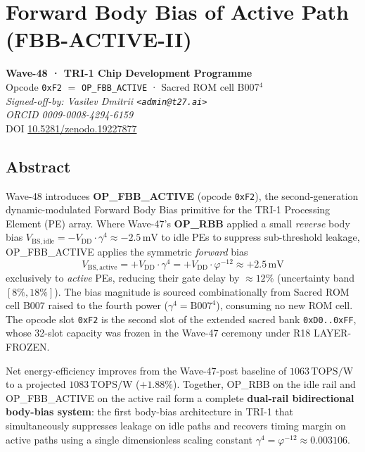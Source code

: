 \documentclass[12pt,a4paper]{report}
\theoremstyle{plain}
\theoremstyle{definition}
\theoremstyle{remark}
\newcommand{\opcode}[1]{\texttt{#1}}
\newcommand{\vbs}{V_{\mathrm{BS,active}}}
\newcommand{\vdd}{V_{\mathrm{DD}}}
\newcommand{\gammaFour}{\gamma^{4}}
\newcommand{\phiInvTwelve}{\varphi^{-12}}
\newcommand{\topsw}{\mathrm{TOPS/W}}
\newcommand{\iopFBB}{\opcode{OP\_FBB\_ACTIVE}}
\begin{document}
\setcounter{chapter}{107}   %

\chapter{Forward Body Bias of Active Path (FBB-ACTIVE-II)}
\label{chap:fbb_active}

\begin{center}
  \small
  \textbf{Wave-48 · TRI-1 Chip Development Programme} \\[2pt]
  Opcode \opcode{0xF2} $=$ \iopFBB{} · Sacred ROM cell B007$^{4}$ \\[2pt]
  \textit{Signed-off-by: Vasilev Dmitrii \texttt{<admin@t27.ai>}} \\
  \textit{ORCID 0009-0008-4294-6159} \\[2pt]
  DOI \href{https://doi.org/10.5281/zenodo.19227877}{10.5281/zenodo.19227877}
\end{center}

\section*{Abstract}
\label{sec:abstract}

Wave-48 introduces \textbf{OP\_FBB\_ACTIVE} (opcode \opcode{0xF2}), the second-generation
dynamic-modulated Forward Body Bias primitive for the TRI-1 Processing Element (PE) array.
Where Wave-47's \textbf{OP\_RBB} applied a small \emph{reverse} body bias
$V_{\mathrm{BS,idle}} = -\vdd \cdot \gammaFour \approx -2.5\,\mathrm{mV}$ to idle PEs to
suppress sub-threshold leakage, OP\_FBB\_ACTIVE applies the symmetric \emph{forward} bias
\begin{equation}
  \vbs = +\vdd \cdot \gammaFour = +\vdd \cdot \phiInvTwelve \approx +2.5\,\mathrm{mV}
\end{equation}
exclusively to \emph{active} PEs, reducing their gate delay by $\approx 12\%$ (uncertainty band
$[8\%,18\%]$).  The bias magnitude is sourced combinationally from Sacred ROM cell B007 raised to
the fourth power ($\gammaFour = \mathrm{B007}^{4}$), consuming no new ROM cell.  The opcode slot
\opcode{0xF2} is the second slot of the extended sacred bank \opcode{0xD0..0xFF}, whose 32-slot
capacity was frozen in the Wave-47 ceremony under R18 LAYER-FROZEN.

Net energy-efficiency improves from the Wave-47-post baseline of $1063\,\topsw$ to a projected
$1083\,\topsw$ ($+1.88\%$).  Together, OP\_RBB on the idle rail and OP\_FBB\_ACTIVE on the
active rail form a complete \textbf{dual-rail bidirectional body-bias system}: the first
body-bias architecture in TRI-1 that simultaneously suppresses leakage on idle paths and
recovers timing margin on active paths using a single dimensionless scaling constant
$\gammaFour = \phiInvTwelve \approx 0.003106$.
\end{document}
